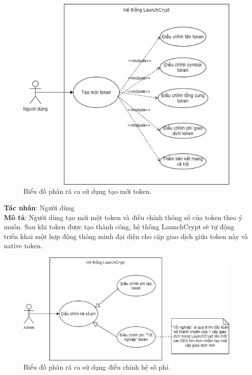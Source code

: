 \begin{figure}[H]
    \begin{center}
        \includegraphics[width=1\textwidth]{figures/c2/CreateToken.png}
        \caption{Biểu đồ phân rã ca sử dụng tạo mới token.}
        \label{fig:feature_interaction_example}
    \end{center}
\end{figure}

\hspace{-1cm}\textbf{Tác nhân}: Người dùng \\
\textbf{Mô tả}: Người dùng tạo mới một token và điều chỉnh thông số của token
theo ý muốn. Sau khi token được tạo thành công, hệ thống LaunchCrypt sẽ tự động triển 
khai một hợp động thông minh đại diện cho cặp giao dịch giữa token này và native token.
\clearpage

\begin{figure}[H]
    \begin{center}
        \includegraphics[width=1\textwidth]{figures/c2/FeeManagement.png}
        \caption{Biểu đồ phân rã ca sử dụng điều chỉnh hệ số phí.}
        \label{fig:feature_interaction_example}
    \end{center}
\end{figure}

